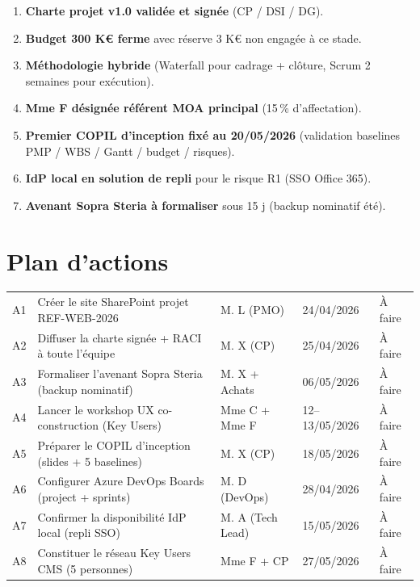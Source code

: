 \documentclass[11pt,a4paper,oneside]{report}
\begin{document}
\begin{decision}
\begin{enumerate}
  \item \textbf{Charte projet v1.0 validée et signée} (CP / DSI / DG).
  \item \textbf{Budget 300 K€ ferme} avec réserve 3 K€ non engagée à ce stade.
  \item \textbf{Méthodologie hybride} (Waterfall pour cadrage + clôture, Scrum 2 semaines pour exécution).
  \item \textbf{Mme F désignée référent MOA principal} (15\,\% d'affectation).
  \item \textbf{Premier COPIL d'inception fixé au 20/05/2026} (validation baselines PMP / WBS / Gantt / budget / risques).
  \item \textbf{IdP local en solution de repli} pour le risque R1 (SSO Office 365).
  \item \textbf{Avenant Sopra Steria à formaliser} sous 15 j (backup nominatif été).
\end{enumerate}
\end{decision}

\section*{Plan d'actions}

\renewcommand{\arraystretch}{1.3}
\begin{tabularx}{\textwidth}{C{0.6cm} Y L{3cm} C{2.2cm} C{2cm}}
\toprule
{}\th{\#} &  &  &  &  \\
\midrule
A1 & Créer le site SharePoint projet REF-WEB-2026 & M. L (PMO) & 24/04/2026 & À faire \\
A2 & Diffuser la charte signée + RACI à toute l'équipe & M. X (CP)   & 25/04/2026 & À faire \\
A3 & Formaliser l'avenant Sopra Steria (backup nominatif) & M. X + Achats & 06/05/2026 & À faire \\
A4 & Lancer le workshop UX co-construction (Key Users) & Mme C + Mme F & 12--13/05/2026 & À faire \\
A5 & Préparer le COPIL d'inception (slides + 5 baselines) & M. X (CP)   & 18/05/2026 & À faire \\
A6 & Configurer Azure DevOps Boards (project + sprints) & M. D (DevOps) & 28/04/2026 & À faire \\
A7 & Confirmer la disponibilité IdP local (repli SSO)    & M. A (Tech Lead) & 15/05/2026 & À faire \\
A8 & Constituer le réseau Key Users CMS (5 personnes)    & Mme F + CP    & 27/05/2026 & À faire \\
\bottomrule
\end{tabularx}
\end{document}

